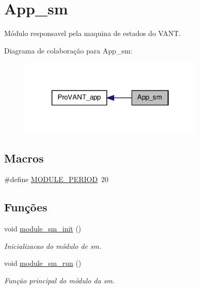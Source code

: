 \hypertarget{group__app__sm}{\section{App\-\_\-sm}
\label{group__app__sm}
}


Módulo responsavel pela maquina de estados do V\-A\-N\-T.  


Diagrama de colaboração para App\-\_\-sm\-:
\nopagebreak
\begin{figure}[H]
\begin{center}
\leavevmode
\includegraphics[width=250pt]{group__app__sm}
\end{center}
\end{figure}
\subsection*{Macros}
\begin{DoxyCompactItemize}
\item 
\#define \hyperlink{group__app__sm_ga0ac6c9f2991b096e49c354e5cce6fae0}{M\-O\-D\-U\-L\-E\-\_\-\-P\-E\-R\-I\-O\-D}~20
\end{DoxyCompactItemize}
\subsection*{Funções}
\begin{DoxyCompactItemize}
\item 
void \hyperlink{group__app__sm_gaf1b95b5ff451c9c5d9a4cdd34531201b}{module\-\_\-sm\-\_\-init} ()
\begin{DoxyCompactList}\small\item\em Inicializacao do módulo de sm. \end{DoxyCompactList}\item 
void \hyperlink{group__app__sm_ga81e54a060d460608697719ba6afab1e4}{module\-\_\-sm\-\_\-run} ()
\begin{DoxyCompactList}\small\item\em Função principal do módulo da sm. \end{DoxyCompactList}\end{DoxyCompactItemize}

